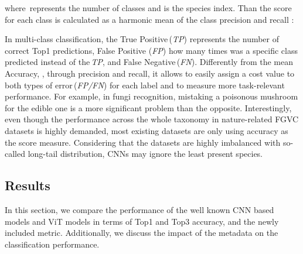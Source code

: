 \documentclass[10pt,twocolumn,letterpaper]{article}
\begin{document}
where\, represents the number of classes and  is the species index. Than the  score for each class is calculated as a harmonic mean of the class precision  and recall :





In multi-class classification, the True Positive\,(\textit{TP}) represents the number of correct Top1 predictions, False Positive (\textit{FP}) how many times was a specific class predicted instead of the\,\textit{TP}, and False Negative\,(\textit{FN}).
Differently from the mean Accuracy, , through precision and recall, it allows to easily assign a cost value to both types of error\,(\textit{FP/FN}) for each label and to measure more task-relevant performance. For example, in fungi recognition, mistaking a poisonous mushroom for the edible one is a more significant problem than the opposite. Interestingly, even though the performance across the whole taxonomy in nature-related FGVC datasets is highly demanded, most existing datasets are only using accuracy as the score measure. Considering that the datasets are highly imbalanced with so-called long-tail distribution, CNNs may ignore the least present species.




\subsection{Results}
\label{results}

In this section, we compare the performance of the well known CNN based models and ViT models in terms of Top1 and Top3 accuracy, and the newly included  metric. Additionally, we discuss the impact of the metadata on the classification performance.
\end{document}
